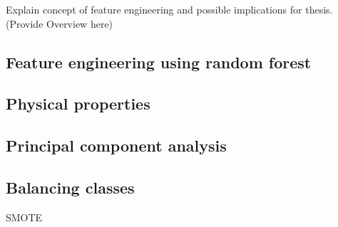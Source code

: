 Explain concept of feature engineering and possible implications for thesis.(Provide Overview here)

\subsection{Feature engineering using random forest}
\subsection{Physical properties}
\subsection{Principal component analysis}
\subsection{Balancing classes}
SMOTE
